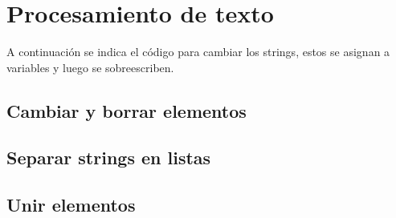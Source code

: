 \section{Procesamiento de texto}
A continuación se indica el código para cambiar los strings, estos se asignan a variables y luego se sobreescriben.

\subsection{Cambiar y borrar elementos}
    

\subsection{Separar strings en listas}
    
\newpage
\subsection{Unir elementos}
    
